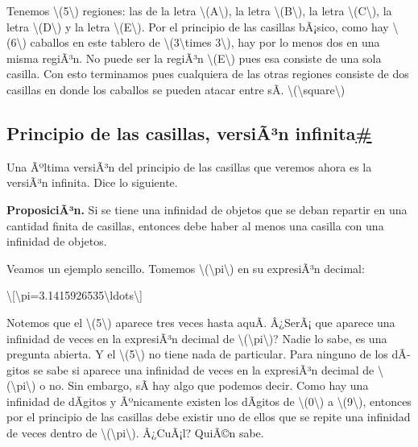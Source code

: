 \documentclass[
]{article}
\makeatletter
\newcommand*\pandocbounded[1]{%
  \sbox\pandoc@box{#1}%
  \Gscale@div\@tempa{\textheight}{\dimexpr\ht\pandoc@box+\dp\pandoc@box\relax}%
  \Gscale@div\@tempb{\linewidth}{\wd\pandoc@box}%
  \ifdim\@tempb\p@<\@tempa\p@\let\@tempa\@tempb\fi%
  \ifdim\@tempa\p@<\p@\scalebox{\@tempa}{\usebox\pandoc@box}%
  \else\usebox{\pandoc@box}%
  \fi%
}
\makeatother
\begin{document}
\pandocbounded{}

Tenemos {\textbackslash(5\textbackslash)} regiones: las de la letra
{\textbackslash(A\textbackslash)}, la letra
{\textbackslash(B\textbackslash)}, la letra
{\textbackslash(C\textbackslash)}, la letra
{\textbackslash(D\textbackslash)} y la letra
{\textbackslash(E\textbackslash)}. Por el principio de las casillas
bÃ¡sico, como hay {\textbackslash(6\textbackslash)} caballos en este
tablero de {\textbackslash(3\textbackslash times 3\textbackslash)}, hay
por lo menos dos en una misma regiÃ³n. No puede ser la regiÃ³n
{\textbackslash(E\textbackslash)} pues esa consiste de una sola casilla.
Con esto terminamos pues cualquiera de las otras regiones consiste de
dos casillas en donde los caballos se pueden atacar entre sÃ­.
{{\textbackslash(\textbackslash square\textbackslash)}}

\label{principio-de-las-casillas-version-infinita}
\subsection{\texorpdfstring{Principio de las casillas, versiÃ³n
infinita\hyperref[principio-de-las-casillas-version-infinita]{\#}}{Principio de las casillas, versiÃ³n infinita\#}}\label{principio-de-las-casillas-versiuxe3uxb3n-infinita}

Una Ãºltima versiÃ³n del principio de las casillas que veremos ahora es
la versiÃ³n infinita. Dice lo siguiente.

\textbf{ProposiciÃ³n.} Si se tiene una infinidad de objetos que se deban
repartir en una cantidad finita de casillas, entonces debe haber al
menos una casilla con una infinidad de objetos.

Veamos un ejemplo sencillo. Tomemos
{\textbackslash(\textbackslash pi\textbackslash)} en su expresiÃ³n
decimal:

\textbackslash{[}\textbackslash pi=3.1415926535\textbackslash ldots\textbackslash{]}

Notemos que el {\textbackslash(5\textbackslash)} aparece tres veces
hasta aquÃ­. Â¿SerÃ¡ que aparece una infinidad de veces en la expresiÃ³n
decimal de {\textbackslash(\textbackslash pi\textbackslash)}? Nadie lo
sabe, es una pregunta abierta. Y el {\textbackslash(5\textbackslash)} no
tiene nada de particular. Para ninguno de los dÃ­gitos se sabe si aparece
una infinidad de veces en la expresiÃ³n decimal de
{\textbackslash(\textbackslash pi\textbackslash)} o no. Sin embargo, sÃ­
hay algo que podemos decir. Como hay una infinidad de dÃ­gitos y
Ãºnicamente existen los dÃ­gitos de {\textbackslash(0\textbackslash)} a
{\textbackslash(9\textbackslash)}, entonces por el principio de las
casillas debe existir uno de ellos que se repite una infinidad de veces
dentro de {\textbackslash(\textbackslash pi\textbackslash)}. Â¿CuÃ¡l?
QuiÃ©n sabe.
\end{document}
